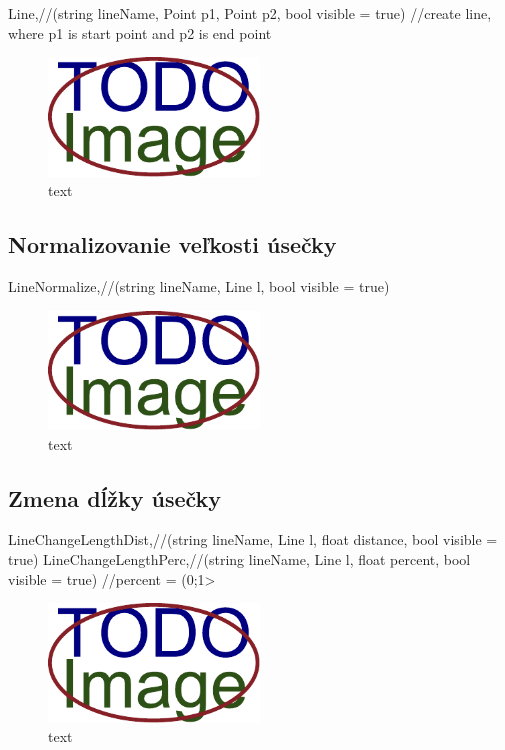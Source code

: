 		Line,//(string lineName, Point p1, Point p2, bool visible = true) //create line, where p1 is start point and p2 is end point

\begin{figure}[H]
	\centering
	\includegraphics[width=0.5\textwidth]{obrazky-figures/placeholder.pdf}
	\caption{text}
	\label{fig:1}
\end{figure}

\subsection{Normalizovanie veľkosti úsečky}
		LineNormalize,//(string lineName, Line l, bool visible = true)

\begin{figure}[H]
	\centering
	\includegraphics[width=0.5\textwidth]{obrazky-figures/placeholder.pdf}
	\caption{text}
	\label{fig:1}
\end{figure}

\subsection{Zmena dĺžky úsečky}
		LineChangeLengthDist,//(string lineName, Line l, float distance, bool visible = true)
		LineChangeLengthPerc,//(string lineName, Line l, float percent, bool visible = true) //percent = (0;1>

\begin{figure}[H]
	\centering
	\includegraphics[width=0.5\textwidth]{obrazky-figures/placeholder.pdf}
	\caption{text}
	\label{fig:1}
\end{figure}


